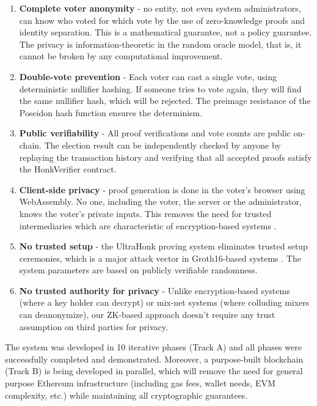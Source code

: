 \documentclass[12pt, a4paper]{report}
\begin{document}
\begin{enumerate}
    \item \textbf{Complete voter anonymity} - no entity, not even system administrators, can know who voted for which vote by the use of zero-knowledge proofs and identity separation. This is a mathematical guarantee, not a policy guarantee. The privacy is information-theoretic in the random oracle model, that is, it cannot be broken by any computational improvement.
    
    \item \textbf{Double-vote prevention} - Each voter can cast a single vote, using deterministic nullifier hashing. If someone tries to vote again, they will find the same nullifier hash, which will be rejected. The preimage resistance of the Poseidon hash function ensures the determinism.
    
    \item \textbf{Public verifiability} - All proof verifications and vote counts are public on-chain. The election result can be independently checked by anyone by replaying the transaction history and verifying that all accepted proofs satisfy the HonkVerifier contract.
    
    \item \textbf{Client-side privacy} - proof generation is done in the voter's browser using WebAssembly. No one, including the voter, the server or the administrator, knows the voter's private inputs. This removes the need for trusted intermediaries which are characteristic of encryption-based systems \cite{madise2005evoting, federalchancellery_evoting}.
    
    \item \textbf{No trusted setup} - the UltraHonk proving system \cite{aztec2024ultrahonk} eliminates trusted setup ceremonies, which is a major attack vector in Groth16-based systems \cite{groth2016size}. The system parameters are based on publicly verifiable randomness.
    
    \item \textbf{No trusted authority for privacy} - Unlike encryption-based systems (where a key holder can decrypt) or mix-net systems (where colluding mixers can deanonymize), our ZK-based approach doesn't require any trust assumption on third parties for privacy.
\end{enumerate}

The system was developed in 10 iterative phases (Track A) and all phases were successfully completed and demonstrated. Moreover, a purpose-built blockchain (Track B) is being developed in parallel, which will remove the need for general purpose Ethereum infrastructure (including gas fees, wallet needs, EVM complexity, etc.) while maintaining all cryptographic guarantees.
\end{document}
